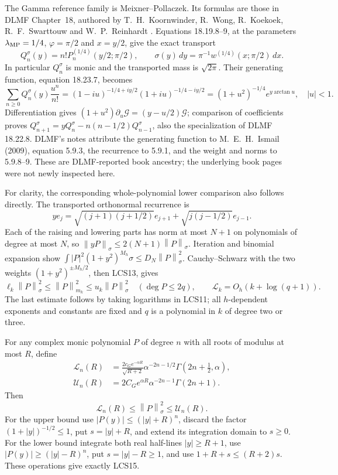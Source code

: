 \documentclass[11pt,a4paper]{article}
\providecommand{\norm}[1]{\left\lVert#1\right\rVert}
\begin{document}
The Gamma reference family is Meixner--Pollaczek. Its formulas
are those in DLMF Chapter~18, authored by T.~H.~Koornwinder,
R.~Wong, R.~Koekoek, R.~F.~Swarttouw and W.~P.~Reinhardt
\cite{a04lcs:dlmf18}. Equations 18.19.8--9, at the parameters
$\lambda_{\rm MP}=1/4$, $\varphi=\pi/2$ and $x=y/2$, give the
exact transport
\[
 Q_n^\sigma(y)=n!P_n^{(1/4)}(y/2;\pi/2),\qquad
 \sigma(y)\,dy=\pi^{-1}w^{(1/4)}(x;\pi/2)\,dx.
\]
In particular $Q_n^\sigma$ is monic and the transported mass is
$\sqrt{2\pi}$. Their generating function, equation 18.23.7, becomes
\[
 \sum_{n\ge0}Q_n^\sigma(y)\frac{u^n}{n!}
 =(1-iu)^{-1/4+iy/2}(1+iu)^{-1/4-iy/2}
 =(1+u^2)^{-1/4}e^{y\arctan u},\quad |u|<1.
\]
Differentiation gives $(1+u^2)\partial_u\mathcal G=(y-u/2)\mathcal G$;
comparison of coefficients proves
$Q_{n+1}^\sigma=yQ_n^\sigma-n(n-1/2)Q_{n-1}^\sigma$, also the
specialization of DLMF 18.22.8. DLMF's notes attribute the generating
function to M.~E.~H.~Ismail (2009), equation 5.9.3, the recurrence
to 5.9.1, and the weight and norms to 5.9.8--9. These are
DLMF-reported book ancestry; the underlying book pages were not
newly inspected here.

For clarity, the corresponding whole-polynomial lower comparison
also follows directly. The transported orthonormal recurrence is
\[
 ye_j=\sqrt{(j+1)(j+1/2)}e_{j+1}
           +\sqrt{j(j-1/2)}e_{j-1}.
\]
Each of the raising and lowering parts has norm at most $N+1$
on polynomials of degree at most $N$, so
$\norm{yP}_\sigma\le2(N+1)\norm P_\sigma$.
Iteration and binomial expansion show
$\int|P|^2(1+y^2)^{M_h}\sigma\le D_N\norm P_\sigma^2$.
Cauchy--Schwarz with the two weights $(1+y^2)^{\pm M_h/2}$,
then LCS13, gives
\begin{equation}\tag{LCS14}
 \ell_k\norm P_\sigma^2\le\norm P_{m_k}^2
       \le u_k\norm P_\sigma^2\quad(\deg P\le2q),\qquad
 \mathscr L_k=O_h(k+\log(q+1)).
\end{equation}
The last estimate follows by taking logarithms in LCS11; all
$h$-dependent exponents and constants are fixed and $q$ is a
polynomial in $k$ of degree two or three.

For any complex monic polynomial $P$ of degree $n$ with all roots
of modulus at most $R$, define
\begin{equation}\tag{LCS15}
\begin{aligned}
 \mathscr L_n(R)&=
 \frac{2c_Ge^{-\alpha R}}{\sqrt{R+2}}
       \alpha^{-2n-1/2}\Gamma(2n+\tfrac12,\alpha),\\
 \mathscr U_n(R)&=2C_Ge^{\alpha R}
       \alpha^{-2n-1}\Gamma(2n+1).
\end{aligned}
\end{equation}
Then
\begin{equation}\tag{LCS16}
 \mathscr L_n(R)\le\norm P_\sigma^2\le\mathscr U_n(R).
\end{equation}
For the upper bound use $|P(y)|\le(|y|+R)^n$, discard the
factor $(1+|y|)^{-1/2}\le1$, put $s=|y|+R$, and extend its
integration domain to $s\ge0$. For the lower bound integrate
both real half-lines $|y|\ge R+1$, use
$|P(y)|\ge(|y|-R)^n$, put $s=|y|-R\ge1$, and use
$1+R+s\le(R+2)s$. These operations give exactly LCS15.
\end{document}
